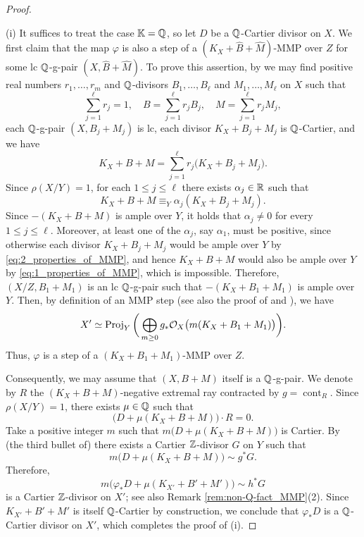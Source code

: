 	\begin{proof}~
		
		\medskip
		
		\noindent (i) It suffices to treat the case $ \mathbb{K} = \mathbb{Q} $, so let $D$ be a $\mathbb{Q}$-Cartier divisor on $X$. We first claim that the map $\varphi$ is also a step of a $(K_X+\hat{B}+\hat{M})$-MMP over $Z$ for some lc $\mathbb{Q}$-g-pair $(X,\hat{B}+\hat{M})$. To prove this assertion, by \cite[Theorem 2.28]{HaconLiu21} we may find positive real numbers $r_1,\dots,r_m$ and $\mathbb{Q}$-divisors $B_1,\dots, B_\ell$ and $M_1,\dots, M_\ell$ on $X$ such that 
		$$\sum_{j=1}^\ell r_j=1, \quad B = \sum_{j=1}^\ell r_j B_j,\quad M = \sum_{j=1}^\ell r_j M_j, $$
		each $\mathbb{Q}$-g-pair $(X,B_j+M_j)$ is lc, each divisor $ K_X + B_j + M_j $ is $ \mathbb{Q} $-Cartier, and we have
		\begin{equation}\label{eq:1_properties_of_MMP}
			K_X + B + M = \sum_{j=1}^\ell r_j \big( K_X + B_j + M_j \big) . 
		\end{equation}
		Since $\rho(X/Y) = 1$, for each $1 \leq j \leq \ell$ there exists $\alpha_j \in \mathbb{R}$ such that
		\begin{equation}\label{eq:2_properties_of_MMP}
			K_X+B+M \equiv_Y \alpha_j (K_X+B_j+M_j) .
		\end{equation}
		Since $-(K_X+B+M)$ is ample over $Y$, it holds that $\alpha_j \neq 0 $ for every $1 \leq j \leq \ell$. Moreover, at least one of the $\alpha_j$, say $\alpha_1$, must be positive, since otherwise each divisor $K_X+B_j+M_j$ would be ample over $Y$ by \eqref{eq:2_properties_of_MMP}, and hence $ K_X+B+M $ would also be ample over $Y$ by \eqref{eq:1_properties_of_MMP}, which is impossible. Therefore, $(X/Z,B_1+M_1)$ is an lc $\mathbb{Q}$-g-pair such that $-(K_X+B_1+M_1)$ is ample over $Y$. Then, by definition of an MMP step (see also the proof of \cite[Theorem 1.6]{Xie22} and \cite[Section 4.9]{Fuj17}), we have
		\[ X' \simeq \operatorname{Proj}_Y \bigg( \bigoplus_{m \geq 0} g_*  \mathcal{O}_X \big( m (K_X +B_1 + M_1) \big) \bigg) . \]
		Thus, $\varphi$ is a step of a $(K_X+B_1+M_1)$-MMP over $Z$.
		
		Consequently, we may assume that $(X,B+M)$ itself is a $\mathbb{Q}$-g-pair. We denote by $R$ the $(K_X+B+M)$-negative extremal ray contracted by $g = \operatorname{cont}_R$. Since $\rho(X/Y) = 1$, there exists $\mu \in \mathbb{Q}$ such that 
		$$ \big( D+\mu(K_X+B+M) \big) \cdot R = 0. $$
		Take a positive integer $m$ such that $ m \big( D+\mu(K_X+B+M) \big) $ is Cartier. By (the third bullet of) \cite[Theorem 1.5]{Xie22} there exists a Cartier $\mathbb{Z}$-divisor $G$ on $Y$ such that 
		$$ m \big( D+\mu(K_X+B+M) \big) \sim g^* G . $$
		Therefore, 
		$$ m \big( \varphi_*D + \mu(K_{X'}+B'+M') \big) \sim h^* G $$ 
		is a Cartier $\mathbb{Z}$-divisor on $X'$; see also Remark \ref{rem:non-Q-fact_MMP}(2). Since $K_{X'}+B'+M'$ is itself $\mathbb{Q}$-Cartier by construction, we conclude that $\varphi_* D$ is a $\mathbb{Q}$-Cartier divisor on $X'$, which completes the proof of (i).
		

\end{proof}
